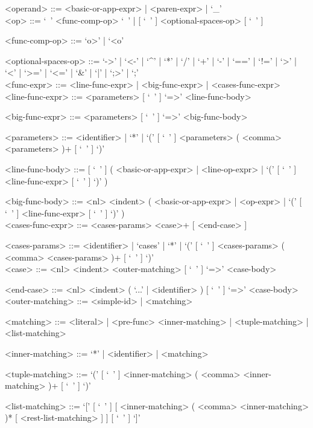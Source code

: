 \documentclass{article}
\begin{document}
\begin{grammar}
<operand> ::= <basic-or-app-expr> | <paren-expr> | `_'
\\

<op> ::= `\ ' <func-comp-op> `\ ' | [ `\ ' ] <optional-spaces-op> [ `\ ' ]

<func-comp-op> ::= `o>' | `<o'

<optional-spaces-op> ::=
`->' | `<-' | `^' | `*' | `/' | `+' | `-' | `==' | `!=' | `>' | `<' | `>=' |
`<=' | `\&' | `|' | `;>' | `;'
\\

\newpage
<func-expr> ::= <line-func-expr> | <big-func-expr> | <cases-func-expr>
\\

<line-func-expr> ::= <parameters> [ `\ ' ] `=>' <line-func-body>

<big-func-expr> ::= <parameters> [ `\ ' ] `=>' <big-func-body>

<parameters> ::=
<identifier> | `*' |
`(' [ `\ ' ] <parameters> ( <comma> <parameters> )+ [ `\ ' ] `)'

<line-func-body> ::=
[ `\ ' ]
(
<basic-or-app-expr> | <line-op-expr> |
`(' [ `\ ' ] <line-func-expr> [ `\ ' ] `)'
)

<big-func-body> ::=
<nl> <indent>
(
<basic-or-app-expr> | <op-expr> | `(' [ `\ ' ] <line-func-expr> [ `\ ' ] `)'
)
\\

<cases-func-expr> ::= <cases-params> <case>+ [ <end-case> ]

<cases-params> ::=
<identifier> | `cases' | `*' |
`(' [ `\ ' ] <cases-params> ( <comma> <cases-params> )+ [ `\ ' ] `)'
\\

<case> ::=  <nl> <indent> <outer-matching> [ `\ ' ] `=>' <case-body>

<end-case> ::=
<nl> <indent> ( `...' | <identifier> ) [ `\ ' ] `=>' <case-body>
\\

<outer-matching> ::= <simple-id> | <matching>

<matching> ::=
<literal> | <pre-func> <inner-matching> | <tuple-matching> | <list-matching>

<inner-matching> ::= `*' | <identifier> | <matching>

<tuple-matching> ::=
`(' [ `\ ' ] <inner-matching> ( <comma> <inner-matching> )+ [ `\ ' ] `)'

<list-matching> ::=
`[' [ `\ ' ]
[ <inner-matching> ( <comma> <inner-matching> )* [ <rest-list-matching> ] ]
[ `\ ' ] `]'


\end{grammar}
\end{document}
